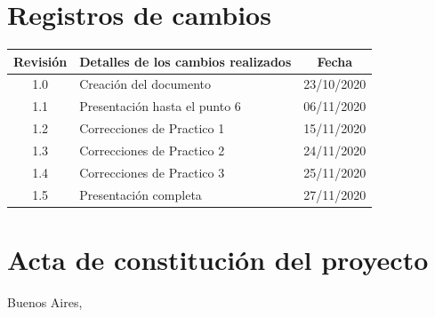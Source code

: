 \documentclass[11pt]{charter}
\begin{document}
\maketitle
\thispagestyle{empty}
\pagebreak


\thispagestyle{empty}
{\setlength{\parskip}{0pt}
\tableofcontents{}
}
\pagebreak


\section{Registros de cambios}
\label{sec:registro}


\begin{table}[ht]
\label{tab:registro}
\centering
\begin{tabularx}{\linewidth}{@{}|c|X|c|@{}}
\hline
\rowcolor[HTML]{C0C0C0} 
Revisión & \multicolumn{1}{c|}{\cellcolor[HTML]{C0C0C0}Detalles de los cambios realizados} & Fecha      \\ \hline
1.0      & Creación del documento                                          & 23/10/2020 \\ \hline
1.1      & Presentación hasta el punto 6                                   & 06/11/2020 \\ \hline
1.2      & Correcciones de Practico 1                                      & 15/11/2020 \\ \hline
1.3      & Correcciones de Practico 2                                      & 24/11/2020 \\ \hline
1.4      & Correcciones de Practico 3                                      & 25/11/2020 \\ \hline
1.5      & Presentación completa                                           & 27/11/2020 \\ \hline
\end{tabularx}
\end{table}

\pagebreak



\section{Acta de constitución del proyecto}
\label{sec:acta}

\begin{flushright}
Buenos Aires, \fechaInicioName
\end{flushright}
\end{document}
